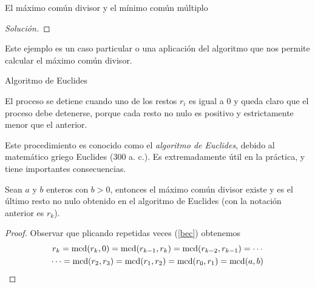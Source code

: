 \begin{section}{El máximo común divisor y el mínimo común
múltiplo}
\begin{proof}[Solución]
\end{proof}

Este ejemplo es un caso particular o una aplicación del algoritmo que nos permite calcular el máximo común divisor.





\begin{table}[htbp]
\centering
{}
\caption{Algoritmo de Euclides}
\label{tabla-AE}
\end{table}

El proceso se detiene cuando uno de los restos $r_i$  es igual a $0$ y queda claro que el proceso debe detenerse, porque cada resto no nulo es positivo y estrictamente menor que el anterior.

Este procedimiento es conocido como el {\em algoritmo de Euclides}, debido al matemático griego Euclides ($300$ a. c.). Es extremadamente útil en la práctica, y tiene importantes consecuencias.


\begin{teorema} Sean  $a$ y $b$ enteros con $b >0$, entonces el máximo común divisor existe y es el último resto no nulo obtenido en el algoritmo de Euclides (con la notación anterior es $r_k$). 
\end{teorema}
\begin{proof}
Observar que plicando repetidas veces (\ref{bec}) obtenemos 
\begin{multline*}
r_k = \operatorname{mcd}(r_{k},0) = \operatorname{mcd}(r_{k-1},r_k) =\operatorname{mcd}(r_{k-2},r_{k-1}) = \cdots\\\cdots 
=  \operatorname{mcd}(r_2,r_3) =  \operatorname{mcd}(r_1,r_2)  =  \operatorname{mcd}(r_0,r_1) = \operatorname{mcd}(a,b)  
\end{multline*}
\end{proof}



\end{section}
